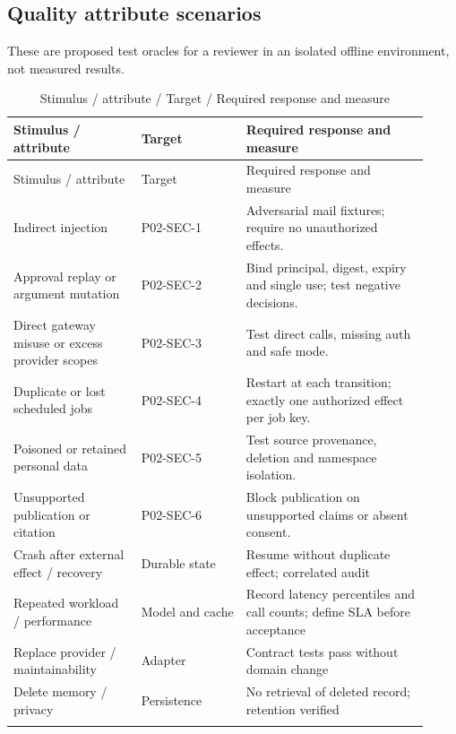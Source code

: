 \documentclass[10pt,letterpaper]{article}
\begin{document}
\subsection{Quality attribute scenarios}
These are proposed test oracles for a reviewer in an isolated offline environment, not measured results.
\begin{longtable}{@{}>{\raggedright\arraybackslash}p{0.29\linewidth}>{\raggedright\arraybackslash}p{0.23\linewidth}>{\raggedright\arraybackslash}p{0.4\linewidth}@{}}
\caption{Stimulus / attribute / Target / Required response and measure}\\
\toprule Stimulus / attribute & Target & Required response and measure\\\midrule\endfirsthead
\toprule Stimulus / attribute & Target & Required response and measure\\\midrule\endhead
Indirect injection & P02-SEC-1 & Adversarial mail fixtures; require no unauthorized effects.\\\addlinespace
Approval replay or argument mutation & P02-SEC-2 & Bind principal, digest, expiry and single use; test negative decisions.\\\addlinespace
Direct gateway misuse or excess provider scopes & P02-SEC-3 & Test direct calls, missing auth and safe mode.\\\addlinespace
Duplicate or lost scheduled jobs & P02-SEC-4 & Restart at each transition; exactly one authorized effect per job key.\\\addlinespace
Poisoned or retained personal data & P02-SEC-5 & Test source provenance, deletion and namespace isolation.\\\addlinespace
Unsupported publication or citation & P02-SEC-6 & Block publication on unsupported claims or absent consent.\\\addlinespace
Crash after external effect / recovery & Durable state & Resume without duplicate effect; correlated audit\\\addlinespace
Repeated workload / performance & Model and cache & Record latency percentiles and call counts; define SLA before acceptance\\\addlinespace
Replace provider / maintainability & Adapter & Contract tests pass without domain change\\\addlinespace
Delete memory / privacy & Persistence & No retrieval of deleted record; retention verified\\\addlinespace
\bottomrule\end{longtable}
\end{document}
